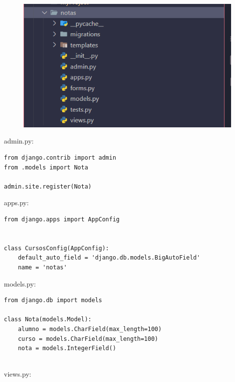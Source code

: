 \documentclass{article}
\begin{document}
    \begin{figure}[H]
           \centering
           \includegraphics[scale=0.6]{latex/img/img11.png}
     \end{figure}


\item admin.py:
 
\begin{lstlisting}
from django.contrib import admin
from .models import Nota

admin.site.register(Nota)

\end{lstlisting}

\item apps.py:
 
\begin{lstlisting}
from django.apps import AppConfig


class CursosConfig(AppConfig):
    default_auto_field = 'django.db.models.BigAutoField'
    name = 'notas'

\end{lstlisting}

\item models.py:
 
\begin{lstlisting}
from django.db import models

class Nota(models.Model):
    alumno = models.CharField(max_length=100)
    curso = models.CharField(max_length=100)
    nota = models.IntegerField()
   

\end{lstlisting}
     
\item  views.py:
 
\end{document}
